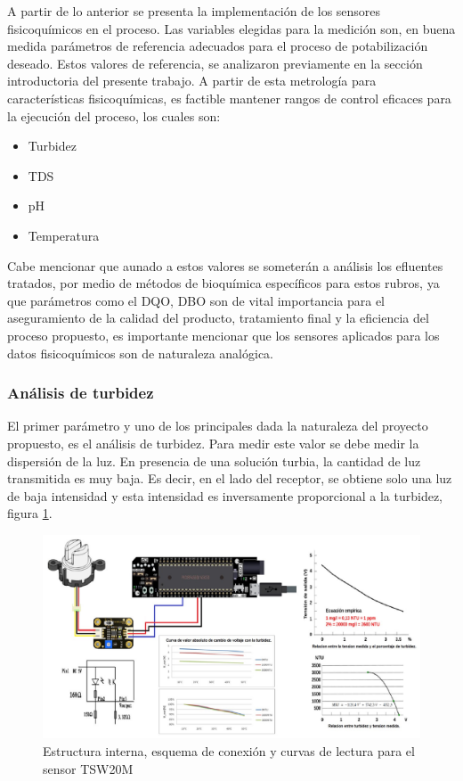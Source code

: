 \documentclass[conference]{IEEEtran}
\begin{document}
A partir de lo anterior se presenta la implementación de los sensores fisicoquímicos en el proceso. Las variables elegidas para la medición son, en buena medida parámetros de referencia adecuados para el proceso de potabilización deseado. Estos valores de referencia, se analizaron previamente en la sección introductoria del presente trabajo. A partir de esta metrología para características fisicoquímicas, es factible mantener rangos de control eficaces para la ejecución del proceso, los cuales son:


\begin{itemize}
	\item Turbidez
	\item TDS
	\item pH
	\item Temperatura
\end{itemize}

Cabe mencionar que aunado a estos valores se someterán a análisis los efluentes tratados, por medio de métodos de bioquímica específicos para estos rubros, ya que parámetros como el DQO, DBO son de vital importancia para el aseguramiento de la calidad del producto, tratamiento final y la eficiencia del proceso propuesto, es importante mencionar que los sensores aplicados para los datos fisicoquímicos son de naturaleza analógica.

\subsubsection{Análisis de turbidez}

El primer parámetro y uno de los principales dada la naturaleza del proyecto propuesto, es el análisis de turbidez. Para medir este valor se debe medir la dispersión de la luz. En presencia de una solución turbia, la cantidad de luz transmitida es muy baja\cite{b28}. Es decir, en el lado del receptor, se obtiene solo una luz de baja intensidad y esta intensidad es inversamente proporcional a la turbidez, figura \ref{fig:12}.

\begin{figure}[htbp]
	\centering
	\includegraphics[width=0.9\columnwidth]{fig12.jpg}
	\caption{Estructura interna, esquema de conexión y curvas de lectura para el sensor TSW20M}
	\label{fig:12}
\end{figure}
\end{document}
